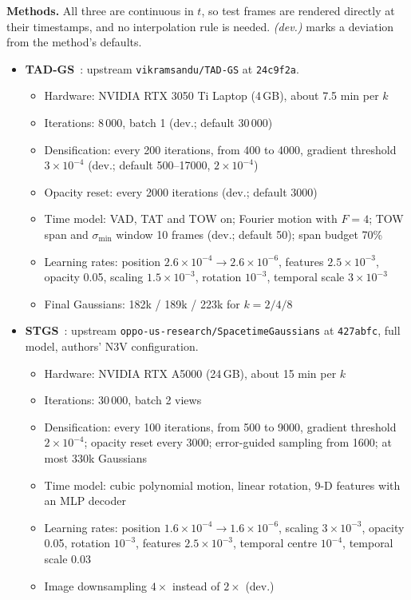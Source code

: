 \documentclass[10pt,a4paper]{article}
\begin{document}
\textbf{Methods.} All three are continuous in $t$, so test frames are rendered directly at their timestamps, and no interpolation rule is needed. \emph{(dev.)} marks a deviation from the method's defaults.
\begin{itemize}
\item \textbf{TAD-GS}~\cite{tadgs}: upstream \texttt{vikramsandu/TAD-GS} at \texttt{24c9f2a}.
\begin{itemize}
\item Hardware: NVIDIA RTX 3050 Ti Laptop (4\,GB), about 7.5 min per $k$
\item Iterations: 8\,000, batch 1 (dev.; default 30\,000)
\item Densification: every 200 iterations, from 400 to 4000, gradient threshold $3\times10^{-4}$ (dev.; default 500--17000, $2\times10^{-4}$)
\item Opacity reset: every 2000 iterations (dev.; default 3000)
\item Time model: VAD, TAT and TOW on; Fourier motion with $F=4$; TOW span and $\sigma_{\min}$ window 10 frames (dev.; default 50); span budget 70\%
\item Learning rates: position $2.6\times10^{-4}\to2.6\times10^{-6}$, features $2.5\times10^{-3}$, opacity 0.05, scaling $1.5\times10^{-3}$, rotation $10^{-3}$, temporal scale $3\times10^{-3}$
\item Final Gaussians: 182k / 189k / 223k for $k=2/4/8$
\end{itemize}
\item \textbf{STGS}~\cite{stgs}: upstream \texttt{oppo-us-research/SpacetimeGaussians} at \texttt{427abfc}, full model, authors' N3V configuration.
\begin{itemize}
\item Hardware: NVIDIA RTX A5000 (24\,GB), about 15 min per $k$
\item Iterations: 30\,000, batch 2 views
\item Densification: every 100 iterations, from 500 to 9000, gradient threshold $2\times10^{-4}$; opacity reset every 3000; error-guided sampling from 1600; at most 330k Gaussians
\item Time model: cubic polynomial motion, linear rotation, 9-D features with an MLP decoder
\item Learning rates: position $1.6\times10^{-4}\to1.6\times10^{-6}$, scaling $3\times10^{-3}$, opacity 0.05, rotation $10^{-3}$, features $2.5\times10^{-3}$, temporal centre $10^{-4}$, temporal scale 0.03
\item Image downsampling $4\times$ instead of $2\times$ (dev.)

\end{itemize}
\end{itemize}
\end{document}
